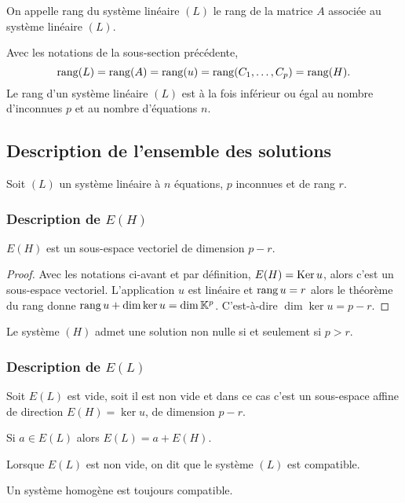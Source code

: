 \begin{defdef}
  On appelle rang du système linéaire \((L)\) le rang de la matrice \(A\) 
  associée au système linéaire \((L)\).
\end{defdef}
%
\begin{prop}
  Avec les notations de la sous-section précédente,
  \begin{equation}
    \operatorname{rang}(L)=\operatorname{rang}(A)=\operatorname{rang}(u)=\operatorname{rang}(C_1,\ldots,C_p) = \operatorname{rang}(H).
  \end{equation}
  Le rang d'un système linéaire \((L)\) est à la fois inférieur ou égal au 
  nombre d'inconnues \(p\) et au nombre d'équations \(n\).
\end{prop}

\subsection{Description de l'ensemble des solutions}

Soit \((L)\) un système linéaire à \(n\) équations, \(p\) inconnues et de rang 
\(r\).

\subsubsection{Description de \(E(H)\)}

\begin{theo}
  \(E(H)\) est un sous-espace vectoriel de dimension \(p-r\).
\end{theo}
\begin{proof}
  Avec les notations ci-avant et par définition, \(E(H) = \operatorname{Ker} u\), alors c'est 
  un sous-espace vectoriel. L'application \(u\) est linéaire et \(\operatorname{rang} u = r\) 
  alors le théorème du rang donne \(\operatorname{rang} u +\dim \ker u = \dim \mathbb{K}^p\). 
  C'est-à-dire \(\dim \ker u = p-r\).
\end{proof}
\begin{corth}
  Le système \((H)\) admet une solution non nulle si et seulement si \(p>r\).
\end{corth}

\subsubsection{Description de \(E(L)\)}

\begin{theo}
  Soit \(E(L)\) est vide, soit il est non vide et dans ce cas c'est un 
  sous-espace affine de direction \(E(H) = \ker u\), de dimension \(p-r\).

  Si \(a \in E(L)\) alors \(E(L) = a+E(H)\).
\end{theo}
%
\begin{defdef}
  Lorsque \(E(L)\) est non vide, on dit que le système \((L)\) est compatible.
\end{defdef}
%
Un système homogène est toujours compatible.
%
